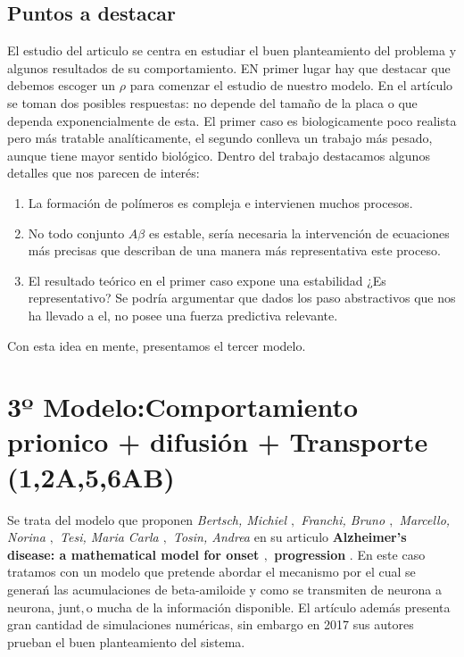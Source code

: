 \documentclass[1p]{elsarticle}
\begin{document}
\subsection{Puntos a destacar}
El estudio del articulo se centra en estudiar el buen planteamiento del problema y algunos resultados de su comportamiento.
EN primer lugar hay que destacar que debemos escoger un $\rho$ para comenzar el estudio de nuestro modelo. En el artículo se toman dos posibles respuestas:
no depende del tamaño de la placa o que dependa exponencialmente de esta. El primer caso es biologicamente poco realista pero más tratable analíticamente, el segundo conlleva un trabajo más pesado, aunque tiene mayor sentido biológico.
Dentro del trabajo destacamos algunos detalles que nos parecen de interés:
\begin{enumerate}
	\item La formación de polímeros es compleja e intervienen muchos procesos.
	\item No todo conjunto $A\beta$ es estable, sería necesaria la intervención de ecuaciones más precisas que describan de una manera más representativa este proceso.
	\item El resultado teórico en el primer caso expone una estabilidad ¿Es representativo? Se podría argumentar que dados los paso abstractivos que nos ha llevado a el, no posee una fuerza predictiva relevante.
\end{enumerate}
Con esta idea en mente, presentamos el tercer modelo.







\section{3º Modelo:Comportamiento prionico + difusión + Transporte (1,2A,5,6AB)}
Se trata del modelo que proponen \textit{Bertsch, Michiel $,$ Franchi, Bruno $,$ Marcello, Norina $,$ Tesi, Maria Carla $,$ Tosin, Andrea} en su articulo \textbf{Alzheimer's disease: a mathematical model for onset $,$ progression} \cite{bertsch}. En este caso tratamos con un modelo que pretende abordar el mecanismo por el cual se generań las acumulaciones de beta-amiloide y como se transmiten de neurona a neurona, junt$,$o mucha de la información disponible. El artículo además presenta gran cantidad de simulaciones numéricas, sin embargo en 2017 sus autores prueban el buen planteamiento del sistema.
\end{document}
